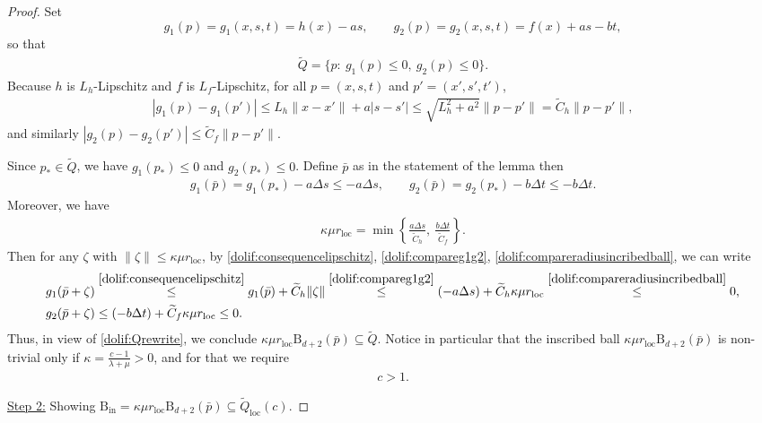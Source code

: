 \documentclass[10pt,a4paper]{amsart}
\newcommand{\Q}{\widetilde{Q}}
\newcommand{\ball}{\mathrm{B}}
\newcommand{\local}{\mathrm{loc}}
\begin{document}
\begin{proof}
\smallskip
Set
\[
g_1( p)=g_1(x,s,t)=h(x)-a s,
\qquad
g_2( p)=g_2(x,s,t)=f(x)+a s-b t,
\]
so that 
\begin{align}
\label{dolif:Qrewrite}
    \Q=\{ p:\ g_1( p)\le 0,\ g_2( p)\le 0\}. 
\end{align}
Because $h$ is $L_h$-Lipschitz and $f$ is $L_f$-Lipschitz, for all $ p=(x,s,t)$ and $ p'=(x',s',t')$,
\begin{align}
\label{dolif:consequencelipschitz}
|g_1( p)-g_1( p')|
\le L_h\|x-x'\|+a|s-s'|
\le \sqrt{L_h^2+a^2} \| p- p'\|
= \widetilde{C}_h\| p- p'\|,
\end{align}
and similarly $|g_2( p)-g_2( p')|\le \widetilde{C}_f\| p- p'\|$.

Since $ p_*\in \Q$, we have $g_1( p_*)\le 0$ and $g_2( p_*)\le 0$.
Define $\bar p$ as in the statement of the lemma then
\begin{align}
\label{dolif:compareg1g2}
g_1(\bar p)=g_1( p_*)-a\Delta s\le -a\Delta s,
\qquad
g_2(\bar p)=g_2( p_*)-b\Delta t\le -b\Delta t.
\end{align}
Moreover, we have 
\begin{align}
\label{dolif:compareradiusincribedball}
\kappa\mu r_\local=\min\left\{\frac{a\Delta s}{\widetilde{C}_h},\ \frac{b\Delta t}{\widetilde{C}_f}\right\}.
\end{align}
Then for any $\zeta$ with $\|\zeta\|\le \kappa\mu r_\local$, by \eqref{dolif:consequencelipschitz}, \eqref{dolif:compareg1g2}, \eqref{dolif:compareradiusincribedball}, we can write
\begin{align*}
g_1(\bar p+\zeta)&\stackrel{\eqref{dolif:consequencelipschitz}}{\le} g_1(\bar p)+\widetilde{C}_h\|\zeta\|\stackrel{\eqref{dolif:compareg1g2}}{\le} (-a\Delta s)+\widetilde{C}_h \kappa\mu r_\local\stackrel{\eqref{dolif:compareradiusincribedball}}{\le} 0,\\
g_2(\bar p+\zeta)&\le (-b\Delta t)+\widetilde{C}_f \kappa\mu r_\local\le 0. 
\end{align*}
Thus, in view of \eqref{dolif:Qrewrite}, we conclude $\kappa\mu r_\local \ball_{d+2}(\bar p)\subseteq \Q$. Notice in particular that the inscribed ball $\kappa\mu r_\local \ball_{d+2}(\bar p)$ is non-trivial only if $\kappa=\frac{c-1}{\lambda+\mu}>0$, and for that we require
\begin{align}
\label{dolif:whyc>1}
    c>1. 
    \end{align}

\smallskip
\underline{Step 2:} Showing $\ball_{\mathrm{in}}=\kappa\mu r_\local \ball_{d+2}(\bar p)\subseteq \Q_\local(c)$.


\end{proof}
\end{document}

